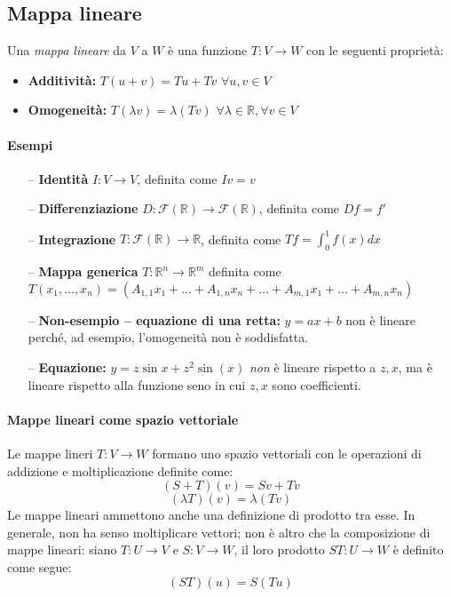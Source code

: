 \documentclass{article}
\begin{document}
        \subsection{Mappa lineare}
            Una \emph{mappa lineare} da $V$ a $W$ è una funzione $T: V \to W$ con le seguenti proprietà:
            \begin{itemize}
                \item \textbf{Additività:} $T(u+v) = Tu+Tv$ $\forall u,v \in V$
                \item \textbf{Omogeneità:} $T(\lambda v) = \lambda(Tv)$ $\forall \lambda \in \mathbb{R}, \forall v \in V$
            \end{itemize}
            \paragraph{Esempi}
            \begin{enumerate}
                \item[--] \textbf{Identità} $I : V \to V$, definita come $Iv=v$
                \item[--] \textbf{Differenziazione} $D:\mathcal{F}(\mathbb{R}) \to \mathcal{F}(\mathbb{R})$, definita come $Df=f'$
                \item[--] \textbf{Integrazione} $T:\mathcal{F}(\mathbb{R}) \to \mathbb{R}$, definita come $Tf=\int_{0}^{1}f(x)dx$
                \item[--] \textbf{Mappa generica} $T : \mathbb{R}^n \to \mathbb{R}^m$ definita come \\$T(x_1, \dots, x_n) = (A_{1,1}x_1 + \dots 
                + A_{1,n}x_n + \dots + A_{m,1}x_1 + \dots + A_{m,n}x_n)$
                \item[--] \textbf{Non-esempio -- equazione di una retta:} $y=ax+b$ non è lineare perché, ad esempio, l'omogeneità non è 
                soddisfatta.
                \item[--] \textbf{Equazione:} $y= z\sin x + z^2 \sin(x)$ \emph{non} è lineare rispetto a $z,x$, ma è lineare rispetto 
                alla funzione seno in cui $z,x$ sono coefficienti.
            \end{enumerate}
            \paragraph{Mappe lineari come spazio vettoriale}
                Le mappe lineri $T : V \to W$ formano uno spazio vettoriali con le operazioni di addizione e moltiplicazione definite come:
                \[(S+T)(v) = Sv+Tv\]
                \[(\lambda T)(v) = \lambda(Tv) \]
                Le mappe lineari ammettono anche una definizione di prodotto tra esse. In generale, non ha senso moltiplicare vettori;
                non è altro che la composizione di mappe lineari: siano $T: U \to V$ e $S:V \to W$, il loro prodotto $ST: U \to W$ è definito
                come segue:
                \[(ST)(u) = S(Tu)\]
\end{document}

